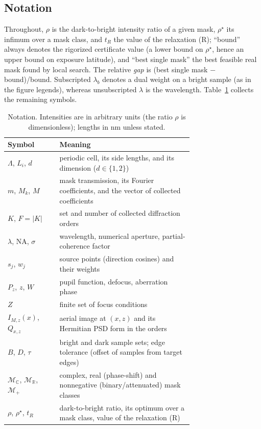 \documentclass[11pt,a4paper]{article}
\newcommand{\R}{\mathbb{R}}\newcommand{\C}{\mathbb{C}}\newcommand{\PSD}{\succeq 0}
\newcommand{\I}{I}\newcommand{\rhostar}{\rho^{\star}}
\newcommand{\NA}{\mathrm{NA}}
\begin{document}
\subsection{Notation}\label{sec:notation}
Throughout, $\rho$ is the dark-to-bright intensity ratio of a given mask, $\rhostar$ its infimum over a mask class, and $t_R$ the value of the relaxation (R); ``bound'' always denotes the rigorized certificate value (a lower bound on $\rhostar$, hence an upper bound on exposure latitude), and ``best single mask'' the best feasible real mask found by local search. The relative \emph{gap} is (best single mask $-$ bound)/bound. Subscripted $\lambda_b$ denotes a dual weight on a bright sample (as in the figure legends), whereas unsubscripted $\lambda$ is the wavelength. Table~\ref{tab:notation} collects the remaining symbols.
\begin{table}[tbp]\centering\small
\caption{Notation. Intensities are in arbitrary units (the ratio $\rho$ is dimensionless); lengths in nm unless stated.}\label{tab:notation}
\begin{tabular}{@{}lp{0.72\linewidth}@{}}\toprule
Symbol & Meaning\\\midrule
$\Lambda$, $L_i$, $d$ & periodic cell, its side lengths, and its dimension ($d\in\{1,2\}$)\\
$m$, $M_k$, $M$ & mask transmission, its Fourier coefficients, and the vector of collected coefficients\\
$K$, $F=|K|$ & set and number of collected diffraction orders\\
$\lambda$, $\NA$, $\sigma$ & wavelength, numerical aperture, partial-coherence factor\\
$s_j$, $w_j$ & source points (direction cosines) and their weights\\
$P_z$, $z$, $W$ & pupil function, defocus, aberration phase\\
$Z$ & finite set of focus conditions\\
$\I_{M,z}(x)$, $Q_{x,z}$ & aerial image at $(x,z)$ and its Hermitian PSD form in the orders\\
$B$, $D$, $\tau$ & bright and dark sample sets; edge tolerance (offset of samples from target edges)\\
$\mathcal M_\C$, $\mathcal M_\R$, $\mathcal M_+$ & complex, real (phase-shift) and nonnegative (binary/attenuated) mask classes\\
$\rho$, $\rhostar$, $t_R$ & dark-to-bright ratio, its optimum over a mask class, value of the relaxation (R)\\

\end{tabular}
\end{table}
\end{document}
